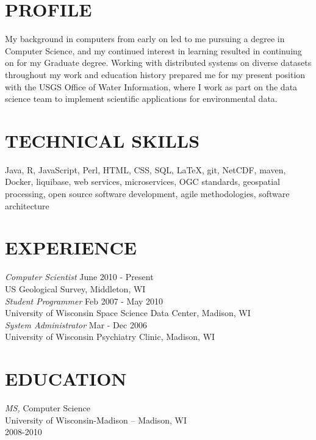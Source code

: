 \documentclass[line,margin]{res}
\begin{document}
\address{8505 Research Way, Middleton WI 53562}
\address{email: jiwalker@usgs.gov | 
phone: 608.821.3842 |
github: https://github.com/jiwalker-usgs} 
\begin{resume}
 
\section{PROFILE} My background in computers from early on led to me pursuing a degree in Computer Science, and my continued interest in learning resulted in continuing on for my Graduate degree.  Working with distributed systems on diverse datasets throughout my work and education history prepared me for my present position with the USGS Office of Water Information, where I work as part on the data science team to implement scientific applications for environmental data.

\section{TECHNICAL SKILLS} Java, R, JavaScript, Perl, HTML, CSS, SQL, \LaTeX, git, NetCDF, maven, Docker, liquibase, web services, microservices, OGC standards, geospatial processing, open source software development, agile methodologies, software architecture

\section{EXPERIENCE} {\sl Computer Scientist} \hfill June 2010 - Present \\
        US Geological Survey, Middleton, WI \\ 
	{\sl Student Programmer} \hfill Feb 2007 - May 2010 \\
        University of Wisconsin Space Science Data Center, Madison, WI \\
	{\sl System Administrator} \hfill Mar - Dec 2006 \\
	University of Wisconsin Psychiatry Clinic, Madison, WI 
 
\section{EDUCATION} {\sl MS,} Computer Science \\
        	     	University of Wisconsin-Madison -- Madison, WI \\ 
                	2008-2010


\end{resume}
\end{document}
